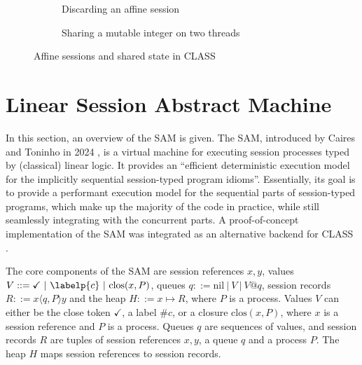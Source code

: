 \begin{figure}
    \begin{subfigure}{.4\textwidth}
        \begin{class}
        \end{class}
        \caption{Discarding an affine session}
        \label{fig:CLASSAffineExample}
    \end{subfigure}
    \begin{subfigure}{.55\textwidth}
        \begin{class}
        \end{class}
        \caption{Sharing a mutable integer on two threads}
        \label{fig:CLASSStateExample}
    \end{subfigure}
    \caption{Affine sessions and shared state in CLASS}
\end{figure}

\section{Linear Session Abstract Machine}

In this section, an overview of the \acf{SAM} is given. The \ac{SAM}, introduced by Caires and Toninho in 2024 \cite{Caires:2024}, is a virtual machine for executing session processes typed by (classical) linear logic. It provides an ``efficient deterministic execution model for the implicitly sequential session-typed program idioms''. Essentially, its goal is to provide a performant execution model for the sequential parts of session-typed programs, which make up the majority of the code in practice, while still seamlessly integrating with the concurrent parts. A proof-of-concept implementation of the \ac{SAM} \cite{Caires:2024:artifact} was integrated as an alternative backend for \ac{CLASS} \cite{Rocha:2021:artifact,Rocha:2023:artifact}.

The core components of the \ac{SAM} are session references $x, y$, values $V ::= \checkmark\ |\ \labelp{c}\ |\ \text{clos}(x, P)$, queues $q ::= \text{nil}\ |\ V\ |\ V@q$, session records $R ::= x\langle q,P\rangle y$ and the heap $H ::= x \mapsto R$, where $P$ is a process. Values $V$ can either be the close token $\checkmark$, a label $\#c$, or a closure $\text{clos}(x, P)$, where $x$ is a session reference and $P$ is a process. Queues $q$ are sequences of values, and session records $R$ are tuples of session references $x, y$, a queue $q$ and a process $P$. The heap $H$ maps session references to session records.

